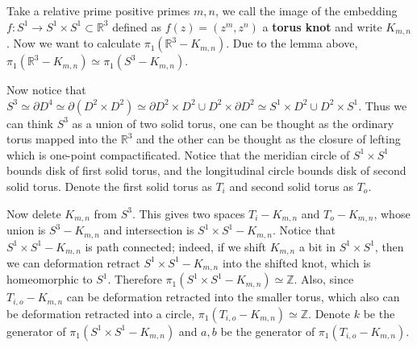 \begin{exmp} Take a relative prime positive primes $m,n$, we call the image of the embedding $f:S^1\rightarrow S^1\times S^1\subset \mathbb{R}^3$ defined as $f(z)=(z^m,z^n)$ a \textbf{torus knot} and write $K_{m,n}$. Now we want to calculate $\pi_1(\mathbb{R}^3-K_{m,n})$. Due to the lemma above, $\pi_1(\mathbb{R}^3-K_{m,n})\simeq \pi_1(S^3-K_{m,n})$.

Now notice that $S^3\simeq \partial D^4\simeq \partial(D^2\times D^2)\simeq \partial D^2\times D^2\cup D^2\times \partial D^2\simeq S^1\times D^2\cup D^2\times S^1$. Thus we can think $S^3$ as a union of two solid torus, one can be thought as the ordinary torus mapped into the $\mathbb{R}^3$ and the other can be thought as the closure of lefting which is one-point compactificated. Notice that the meridian circle of $S^1\times S^1$ bounds disk of first solid torus, and the longitudinal circle bounds disk of second solid torus. Denote the first solid torus as $T_i$ and second solid torus as $T_o$.

Now delete $K_{m,n}$ from $S^3$. This gives two spaces $T_i-K_{m,n}$ and $T_o-K_{m,n}$, whose union is $S^3-K_{m,n}$ and intersection is $S^1\times S^1-K_{m,n}$. Notice that $S^1\times S^1-K_{m,n}$ is path connected; indeed, if we shift $K_{m,n}$ a bit in $S^1\times S^1$, then we can deformation retract $S^1\times S^1-K_{m,n}$ into the shifted knot, which is homeomorphic to $S^1$. Therefore $\pi_1(S^1\times S^1-K_{m,n})\simeq \mathbb{Z}$. Also, since $T_{i,o}-K_{m,n}$ can be deformation retracted into the smaller torus, which also can be deformation retracted into a circle, $\pi_1(T_{i,o}-K_{m,n})\simeq \mathbb{Z}$. Denote $k$ be the generator of $\pi_1(S^1\times S^1-K_{m,n})$ and $a,b$ be the generator of $\pi_1(T_{i,o}-K_{m,n})$.


\end{exmp}
